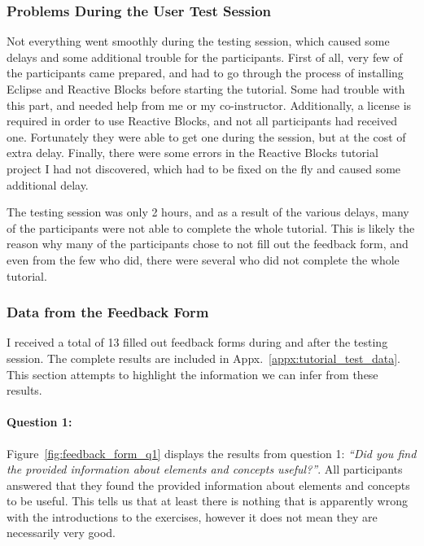 \subsubsection{Problems During the User Test Session}
Not everything went smoothly during the testing session, which caused some delays and some additional trouble for the participants. First of all, very few of the participants came prepared, and had to go through the process of installing Eclipse and Reactive Blocks before starting the tutorial. Some had trouble with this part, and needed help from me or my co-instructor. Additionally, a license is required in order to use Reactive Blocks, and not all participants had received one. Fortunately they were able to get one during the session, but at the cost of extra delay. Finally, there were some errors in the Reactive Blocks tutorial project I had not discovered, which had to be fixed on the fly and caused some additional delay.

\noindent
The testing session was only 2 hours, and as a result of the various delays, many of the participants were not able to complete the whole tutorial. This is likely the reason why many of the participants chose to not fill out the feedback form, and even from the few who did, there were several who did not complete the whole tutorial.

\subsubsection{Data from the Feedback Form}
I received a total of 13 filled out feedback forms during and after the testing session. The complete results are included in Appx.~\ref{appx:tutorial_test_data}. This section attempts to highlight the information we can infer from these results.

\paragraph{Question 1:} Figure~\ref{fig:feedback_form_q1} displays the results from question 1: \emph{``Did you find the provided information about elements and concepts useful?''}. All participants answered that they found the provided information about elements and concepts to be useful. This tells us that at least there is nothing that is apparently wrong with the introductions to the exercises, however it does not mean they are necessarily very good.

